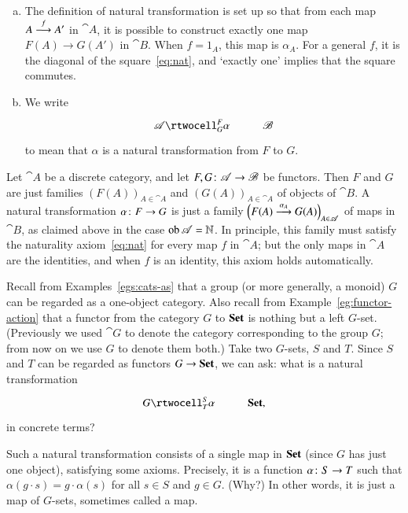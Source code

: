 \begin{remarks} 
\label{rmks:defn-nt}
\begin{enumerate}[(b)]
\item   
\label{rmk:defn-nt:loosely}
The definition of natural transformation is set up so that from each map $A
\stackrel{f}{\longrightarrow} A'$ in $\cat{A}$, it is possible to construct exactly one%
%
%
map $F(A) \to G(A')$ in $\cat{B}$.  When $f = 1_A$, this map is $\alpha_A$.
For a general $f$, it is the diagonal of the square~\eqref{eq:nat}, and
`exactly one' implies that the square commutes.

\item 
We write
\[
\xymatrix{
\cat{A} \rtwocell^F_G{\alpha} &\cat{B}
}%
%
\ntn{double-arrow}
%
\]
to mean that $\alpha$ is a natural transformation from $F$ to $G$.
\end{enumerate}
\end{remarks}

\begin{example}
Let $\cat{A}$ be a discrete%
%
%
category, and let $F, G\from \cat{A} \to \cat{B}$ be functors.  Then $F$
and $G$ are just families $(F(A))_{A \in \cat{A}}$ and $(G(A))_{A \in
  \cat{A}}$ of objects of $\cat{B}$.  A natural transformation $\alpha\from
F \to G$ is just a family $\Bigl( F(A) \stackrel{\alpha_A}{\longrightarrow} G(A) \Bigr)_{A \in
  \mathscr{A}}$ of maps in $\cat{B}$, as claimed above in the case $\operatorname{ob} \mathscr{A}
= \mathbb{N}$.  In principle, this family must satisfy the naturality
axiom~\eqref{eq:nat} for every map $f$ in $\cat{A}$; but the only maps in
$\cat{A}$ are the identities, and when $f$ is an identity, this axiom holds
automatically.
\end{example}

\begin{example}
Recall from Examples~\ref{egs:cats-as} that a group (or more generally, a
monoid) $G$ can be regarded as a one-object%
%
%
category.  Also recall from Example~\ref{eg:functor-action} that a functor
from the category $G$ to $\mathbf{Set}$ is nothing but a left $G$-set.  (Previously
we used $\cat{G}$ to denote the category corresponding to the group $G$;
from now on we use $G$%
%
%
to denote them both.)  Take two $G$-sets, $S$ and $T$.  Since $S$ and $T$
can be regarded as functors $G \to \mathbf{Set}$, we can ask: what is a natural
transformation
\[
\xymatrix{
G \rtwocell^S_T{\alpha} &\Set,
}
\]
in concrete terms?

Such a natural transformation consists of a single map in $\mathbf{Set}$ (since $G$
has just one object), satisfying some axioms.  Precisely, it is a function
$\alpha\from S \to T$ such that $\alpha(g\cdot s) = g\cdot \alpha(s)$ for
all $s \in S$ and $g \in G$.  (Why?)  In other words, it is just a map of
$G$-sets, sometimes called a %
%
%
map.
\end{example}

